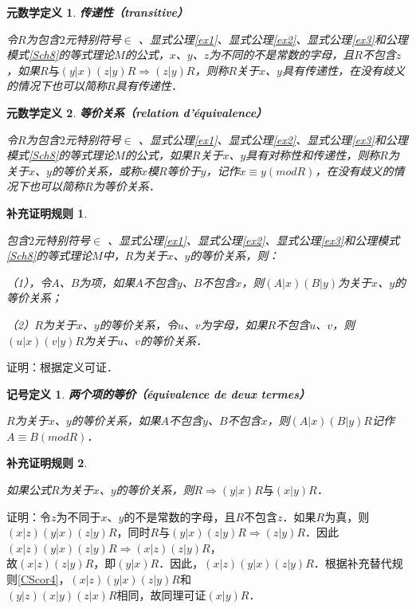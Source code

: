 \documentclass[12pt, a4paper, oneside]{book}
\newtheorem{metadef}{元数学定义}
\newtheorem{sign}{记号定义}
\newtheorem{Ccor}{补充证明规则}
\begin{document}
			\begin{metadef}
				\textbf{传递性（transitive）}
				\par
				令$R$为包含$2$元特别符号$\in$ 、显式公理\ref{ex1}、显式公理\ref{ex2}、显式公理\ref{ex3}和公理模式\ref{Sch8}的等式理论$M$的公式，$x$、$y$、$z$为不同的不是常数的字母，且$R$不包含$z$，如果$R\text{与}(y|x)(z|y)R\Rightarrow (z|y)R$，则称$R$关于$x$、$y$具有传递性，在没有歧义的情况下也可以简称$R$具有传递性．
			\end{metadef}

			\begin{metadef}
				\textbf{等价关系（relation d'équivalence）}
				\par
				令$R$为包含$2$元特别符号$\in$ 、显式公理\ref{ex1}、显式公理\ref{ex2}、显式公理\ref{ex3}和公理模式\ref{Sch8}的等式理论$M$的公式，如果$R$关于$x$、$y$具有对称性和传递性，则称$R$为关于$x$、$y$的等价关系，或称$x$模$R$等价于$y$，记作$x\equiv y(mod R)$，在没有歧义的情况下也可以简称$R$为等价关系．
			\end{metadef}

			\begin{Ccor}\label{Ccor22}
				\hfill\par
				包含$2$元特别符号$\in$ 、显式公理\ref{ex1}、显式公理\ref{ex2}、显式公理\ref{ex3}和公理模式\ref{Sch8}的等式理论$M$中，$R$为关于$x$、$y$的等价关系，则：
				\par
				（1），令$A$、$B$为项，如果$A$不包含$y$、$B$不包含$x$，则$(A|x)(B|y)$为关于$x$、$y$的等价关系；
				\par
				（2）$R$为关于$x$、$y$的等价关系，令$u$、$v$为字母，如果$R$不包含$u$、$v$，则$(u|x)(v|y)R$为关于$u$、$v$的等价关系．
			\end{Ccor}
			证明：根据定义可证．

			\begin{sign}
				\textbf{两个项的等价（équivalence de deux termes）}
				\par
				$R$为关于$x$、$y$的等价关系，如果$A$不包含$y$、$B$不包含$x$，则$(A|x)(B|y)R$记作\\$A\equiv B(mod R)$．
			\end{sign}

			\begin{Ccor}\label{Ccor23}
				\hfill\par
				如果公式$R$为关于$x$、$y$的等价关系，则$R\Rightarrow (y|x)R\text{与}(x|y)R$．
			\end{Ccor}
			证明：令$z$为不同于$x$、$y$的不是常数的字母，且$R$不包含$z$．如果$R$为真，则\\$(x|z)(y|x)(z|y)R$，同时$R\text{与}(y|x)(z|y)R\Rightarrow (z|y)R$．因此$(x|z)(y|x)(z|y)R\Rightarrow (x|z)(z|y)R$，\\故$(x|z)(z|y)R$，即$(y|x)R$．因此，$(x|z)(y|x)(z|y)R$．根据补充替代规则\ref{CScor4}，$(x|z)(y|x)(z|y)R$和\\$(y|z)(x|y)(z|x)R$相同，故同理可证$(x|y)R$．
\end{document}
